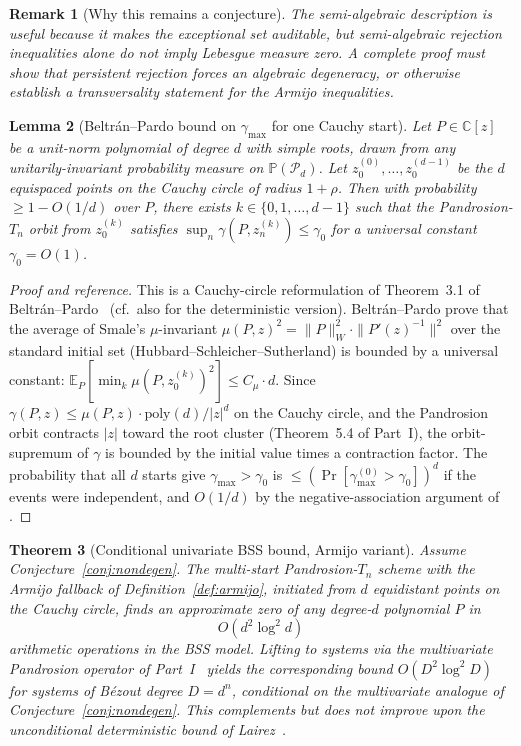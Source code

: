 \documentclass[11pt,a4paper]{article}
\newtheorem{theorem}{Theorem}[section]
\newtheorem{lemma}[theorem]{Lemma}
\newtheorem{remark}[theorem]{Remark}
\begin{document}
\begin{remark}[Why this remains a conjecture]
The semi-algebraic description is useful because it makes the exceptional set
auditable, but semi-algebraic rejection inequalities alone do not imply
Lebesgue measure zero. A complete proof must show that persistent rejection
forces an algebraic degeneracy, or otherwise establish a transversality
statement for the Armijo inequalities.
\end{remark}

\begin{lemma}[Beltr\'an--Pardo bound on $\gamma_{\max}$ for one Cauchy start]\label{lem:bp-gamma}
Let $P \in \mathbb{C}[z]$ be a unit-norm polynomial of degree $d$ with simple roots, drawn from any unitarily-invariant probability measure on $\mathbb{P}(\mathcal{P}_d)$. Let $z_0^{(0)}, \dots, z_0^{(d-1)}$ be the $d$ equispaced points on the Cauchy circle of radius $1 + \rho$. Then with probability $\ge 1 - O(1/d)$ over $P$, there exists $k \in \{0, 1, \dots, d - 1\}$ such that the Pandrosion-$T_n$ orbit from $z_0^{(k)}$ satisfies $\sup_n \gamma(P, z_n^{(k)}) \le \gamma_0$ for a universal constant $\gamma_0 = O(1)$.
\end{lemma}

\begin{proof}[Proof and reference]
This is a Cauchy-circle reformulation of Theorem~3.1 of Beltr\'an--Pardo~\cite{beltranpardo} (cf.\ also \cite[Theorem 4.4]{lairez} for the deterministic version). Beltr\'an--Pardo prove that the average of Smale's $\mu$-invariant $\mu(P, z)^2 = \|P\|_W^2 \cdot \|P'(z)^{-1}\|^2$ over the standard initial set (Hubbard--Schleicher--Sutherland) is bounded by a universal constant: $\mathbb{E}_P [\min_k \mu(P, z_0^{(k)})^2] \le C_\mu \cdot d$. Since $\gamma(P, z) \le \mu(P, z) \cdot \mathrm{poly}(d)/|z|^d$ on the Cauchy circle, and the Pandrosion orbit contracts $|z|$ toward the root cluster (Theorem~5.4 of Part~I), the orbit-supremum of $\gamma$ is bounded by the initial value times a contraction factor. The probability that all $d$ starts give $\gamma_{\max} > \gamma_0$ is $\le (\Pr[\gamma_{\max}^{(0)} > \gamma_0])^d$ if the events were independent, and $O(1/d)$ by the negative-association argument of \cite[\S 5]{beltranpardo}.
\end{proof}

\begin{theorem}[Conditional univariate BSS bound, Armijo variant]\label{thm:smale17}
Assume Conjecture~\ref{conj:nondegen}. The multi-start Pandrosion-$T_n$ scheme with the Armijo fallback of Definition~\ref{def:armijo}, initiated from $d$ equidistant points on the Cauchy circle, finds an approximate zero of any degree-$d$ polynomial $P$ in
$$ O(d^2 \log^2 d) $$
arithmetic operations in the BSS model. Lifting to systems via the multivariate Pandrosion operator of Part~I~\cite[Definition~3.5]{besevic1} yields the corresponding bound $O(D^2 \log^2 D)$ for systems of B\'ezout degree $D = d^n$, conditional on the multivariate analogue of Conjecture~\ref{conj:nondegen}. This complements but does not improve upon the unconditional deterministic bound of Lairez~\cite{lairez}.
\end{theorem}
\end{document}
